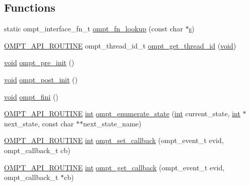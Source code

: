 \subsection*{Functions}
\begin{DoxyCompactItemize}
\item 
static ompt\-\_\-interface\-\_\-fn\-\_\-t \hyperlink{ompt-general_8c_a7d3f217c9de3e9699cd44e98e590e9bc}{ompt\-\_\-fn\-\_\-lookup} (const char $\ast$\hyperlink{ittnotify__static_8h_a110bd9ede250f97ce56d81bb3c7b171d}{s})
\item 
\hyperlink{ompt-general_8c_a83ee3110ea7d8f814842b08230c53a0d}{O\-M\-P\-T\-\_\-\-A\-P\-I\-\_\-\-R\-O\-U\-T\-I\-N\-E} ompt\-\_\-thread\-\_\-id\-\_\-t \hyperlink{ompt-general_8c_a5de912de40e00ac60886cd6495209a8b}{ompt\-\_\-get\-\_\-thread\-\_\-id} (\hyperlink{ittnotify__static_8h_af941d56e55e3c5465135b60c4d6343ed}{void})
\item 
\hyperlink{ittnotify__static_8h_af941d56e55e3c5465135b60c4d6343ed}{void} \hyperlink{ompt-general_8c_a904f6e7feaaf4bcaf951027c2378c056}{ompt\-\_\-pre\-\_\-init} ()
\item 
\hyperlink{ittnotify__static_8h_af941d56e55e3c5465135b60c4d6343ed}{void} \hyperlink{ompt-general_8c_aec05138d98afc56af2b9c69358777937}{ompt\-\_\-post\-\_\-init} ()
\item 
\hyperlink{ittnotify__static_8h_af941d56e55e3c5465135b60c4d6343ed}{void} \hyperlink{ompt-general_8c_a037e453a3ca5f6cadb948ab9c5451350}{ompt\-\_\-fini} ()
\item 
\hyperlink{ompt-general_8c_a83ee3110ea7d8f814842b08230c53a0d}{O\-M\-P\-T\-\_\-\-A\-P\-I\-\_\-\-R\-O\-U\-T\-I\-N\-E} \hyperlink{ittnotify__static_8h_a8b8dcd723308a8cb5d84277c7a3fff70}{int} \hyperlink{ompt-general_8c_a92b7ea0571bdeab995e34ee8e7ad8c5b}{ompt\-\_\-enumerate\-\_\-state} (\hyperlink{ittnotify__static_8h_a8b8dcd723308a8cb5d84277c7a3fff70}{int} current\-\_\-state, \hyperlink{ittnotify__static_8h_a8b8dcd723308a8cb5d84277c7a3fff70}{int} $\ast$next\-\_\-state, const char $\ast$$\ast$next\-\_\-state\-\_\-name)
\item 
\hyperlink{ompt-general_8c_a83ee3110ea7d8f814842b08230c53a0d}{O\-M\-P\-T\-\_\-\-A\-P\-I\-\_\-\-R\-O\-U\-T\-I\-N\-E} \hyperlink{ittnotify__static_8h_a8b8dcd723308a8cb5d84277c7a3fff70}{int} \hyperlink{ompt-general_8c_ab58eae0d1fdb3cab3b7ae6e0fd2942d9}{ompt\-\_\-set\-\_\-callback} (ompt\-\_\-event\-\_\-t evid, ompt\-\_\-callback\-\_\-t cb)
\item 
\hyperlink{ompt-general_8c_a83ee3110ea7d8f814842b08230c53a0d}{O\-M\-P\-T\-\_\-\-A\-P\-I\-\_\-\-R\-O\-U\-T\-I\-N\-E} \hyperlink{ittnotify__static_8h_a8b8dcd723308a8cb5d84277c7a3fff70}{int} \hyperlink{ompt-general_8c_ae34e38d334b0a95167b84785317eb703}{ompt\-\_\-get\-\_\-callback} (ompt\-\_\-event\-\_\-t evid, ompt\-\_\-callback\-\_\-t $\ast$cb)
$$
\end{DoxyCompactItemize}
